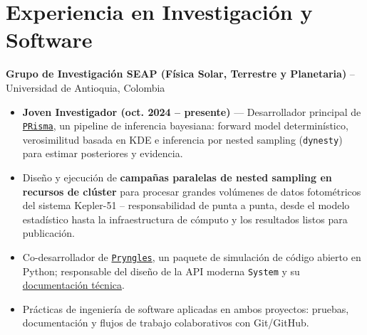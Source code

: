 \section*{Experiencia en Investigación y Software}
\textbf{Grupo de Investigación SEAP (Física Solar, Terrestre y Planetaria)} -- Universidad de Antioquia, Colombia
\begin{itemize}
    \item \textbf{Joven Investigador (oct. 2024 -- presente)} — Desarrollador principal de \href{https://github.com/seap-udea/PRisma}{\texttt{PRisma}}, un pipeline de inferencia bayesiana: forward model determinístico, verosimilitud basada en KDE e inferencia por nested sampling (\texttt{dynesty}) para estimar posteriores y evidencia.
    \item Diseño y ejecución de \textbf{campañas paralelas de nested sampling en recursos de clúster} para procesar grandes volúmenes de datos fotométricos del sistema Kepler-51 -- responsabilidad de punta a punta, desde el modelo estadístico hasta la infraestructura de cómputo y los resultados listos para publicación.
    \item Co-desarrollador de \href{https://github.com/seap-udea/pryngles}{\texttt{Pryngles}}, un paquete de simulación de código abierto en Python; responsable del diseño de la API moderna \texttt{System} y su \href{https://pryngles.readthedocs.io}{documentación técnica}.
    \item Prácticas de ingeniería de software aplicadas en ambos proyectos: pruebas, documentación y flujos de trabajo colaborativos con Git/GitHub.
\end{itemize}
